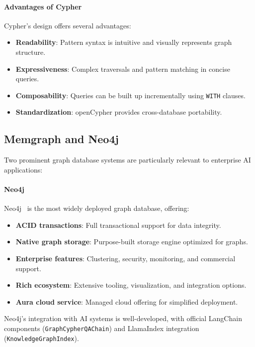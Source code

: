 \paragraph{Advantages of Cypher}

Cypher's design offers several advantages:
\begin{itemize}
    \item \textbf{Readability}: Pattern syntax is intuitive and visually represents graph structure.
    \item \textbf{Expressiveness}: Complex traversals and pattern matching in concise queries.
    \item \textbf{Composability}: Queries can be built up incrementally using \texttt{WITH} clauses.
    \item \textbf{Standardization}: openCypher provides cross-database portability.
\end{itemize}

\subsection{Memgraph and Neo4j}

Two prominent graph database systems are particularly relevant to enterprise AI applications:

\paragraph{Neo4j}

Neo4j~%
is the most widely deployed graph database, offering:
\begin{itemize}
    \item \textbf{ACID transactions}: Full transactional support for data integrity.
    \item \textbf{Native graph storage}: Purpose-built storage engine optimized for graphs.
    \item \textbf{Enterprise features}: Clustering, security, monitoring, and commercial support.
    \item \textbf{Rich ecosystem}: Extensive tooling, visualization, and integration options.
    \item \textbf{Aura cloud service}: Managed cloud offering for simplified deployment.
\end{itemize}

Neo4j's integration with AI systems is well-developed, with official LangChain components (\texttt{GraphCypherQAChain}) and LlamaIndex integration (\texttt{KnowledgeGraphIndex}).

